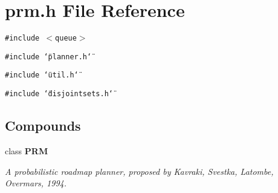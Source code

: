 \section{prm.h File Reference}
\label{prm_8h}
{\tt \#include $<$queue$>$}\par
{\tt \#include \char`\"{}planner.h\char`\"{}}\par
{\tt \#include \char`\"{}util.h\char`\"{}}\par
{\tt \#include \char`\"{}disjointsets.h\char`\"{}}\par
\subsection*{Compounds}
\begin{CompactItemize}
\item 
class {\bf PRM}
\begin{CompactList}\small\item\em A probabilistic roadmap planner, proposed by Kavraki, Svestka, Latombe, Overmars, 1994.\item\end{CompactList}\end{CompactItemize}
